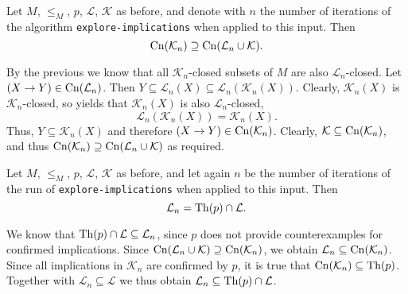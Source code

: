 \begin{Corollary}
  \label{cor:explore-implications-closures-coincide}
  Let $M$, $\leq_M$, $p$, $\mathcal{L}$, $\mathcal{K}$ as before, and denote with $n$ the
  number of iterations of the algorithm \lstinline{explore-implications} when applied to
  this input.  Then
  \begin{equation*}
    \operatorname{Cn}(\mathcal{K}_n) \supseteq \operatorname{Cn}(\mathcal{L}_n \cup \mathcal{K}).
  \end{equation*}
\end{Corollary}
\begin{Proof}
  By the previous  we know that all
  $\mathcal{K}_n$-closed subsets of $M$ are also $\mathcal{L}_n$-closed.  Let $(X \to Y)
  \in \operatorname{Cn}(\mathcal{L}_n)$.  Then $Y \subseteq \mathcal{L}_n(X) \subseteq
  \mathcal{L}_n(\mathcal{K}_n(X))$.  Clearly, $\mathcal{K}_n(X)$ is
  $\mathcal{K}_n$-closed, so  yields
  that $\mathcal{K}_n(X)$ is also $\mathcal{L}_n$-closed, \ie
  \begin{equation*}
    \mathcal{L}_n(\mathcal{K}_n(X)) = \mathcal{K}_n(X).
  \end{equation*}
  Thus, $Y \subseteq \mathcal{K}_n(X)$ and therefore $(X \to Y) \in \operatorname{Cn}(\mathcal{K}_n)$.
  Clearly, $\mathcal{K} \subseteq \operatorname{Cn}(\mathcal{K}_n)$, and thus $\operatorname{Cn}(\mathcal{K}_n)
  \supseteq \operatorname{Cn}(\mathcal{L}_n \cup \mathcal{K})$ as required.
\end{Proof}

\begin{Corollary}
  \label{cor:explore-implications-L_n-exactly-those-confirmed-by-expert}
  Let $M$, $\leq_M$, $p$, $\mathcal{L}$, $\mathcal{K}$ as before, and let again $n$ be
  the number of iterations of the run of \lstinline{explore-implications} when applied to
  this input.  Then
  \begin{equation*}
    \mathcal{L}_n = \operatorname{Th}(p) \cap \mathcal{L}.
  \end{equation*}
\end{Corollary}
\begin{Proof}
  We know that $\operatorname{Th}(p) \cap \mathcal{L} \subseteq \mathcal{L}_{n}$, since $p$ does not
  provide counterexamples for confirmed implications.  Since $\operatorname{Cn}(\mathcal{L}_{n} \cup
  \mathcal{K}) \supseteq \operatorname{Cn}(\mathcal{K}_{n})$, we obtain $\mathcal{L}_{n} \subseteq
  \operatorname{Cn}(\mathcal{K}_{n})$.  Since all implications in $\mathcal{K}_{n}$ are confirmed by
  $p$, it is true that $\operatorname{Cn}(\mathcal{K}_{n}) \subseteq \operatorname{Th}(p)$.  Together with
  $\mathcal{L}_{n} \subseteq \mathcal{L}$ we thus obtain $\mathcal{L}_{n} \subseteq \operatorname{Th}(p)
  \cap \mathcal{L}$.
\end{Proof}

